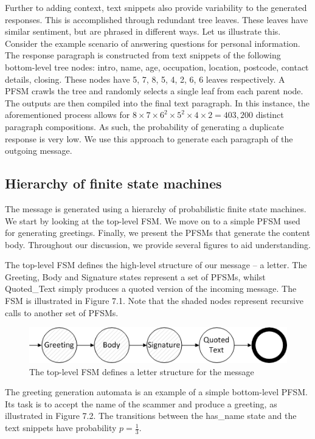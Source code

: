 Further to adding context, text snippets also provide variability to the generated responses. This is accomplished through redundant tree leaves. These leaves have similar sentiment, but are phrased in different ways. Let us illustrate this. Consider the example scenario of answering questions for personal information. The response paragraph is constructed from text snippets of the following bottom-level tree nodes: intro, name, age, occupation, location, postcode, contact details, closing. These nodes have 5, 7, 8, 5, 4, 2, 6, 6 leaves respectively. A PFSM crawls the tree and randomly selects a single leaf from each parent node. The outputs are then compiled into the final text paragraph. In this instance, the aforementioned process allows for $8 \times 7 \times 6^2 \times 5 ^ 2 \times 4 \times 2 = 403,200$ distinct paragraph compositions. As such, the probability of generating a duplicate response is very low. We use this approach to generate each paragraph of the outgoing message.

\subsection{Hierarchy of finite state machines}

The message is generated using a hierarchy of probabilistic finite state machines. We start by looking at the top-level FSM. We move on to a simple PFSM used for generating greetings. Finally, we present the PFSMs that generate the content body. Throughout our discussion, we provide several figures to aid understanding. 

The top-level FSM defines the high-level structure of our message -- a letter. The Greeting, Body and Signature states represent a set of PFSMs, whilst Quoted\_Text simply produces a quoted version of the incoming message. The FSM is illustrated in Figure 7.1. Note that the shaded nodes represent recursive calls to another set of PFSMs.

\begin{figure}[h]
\centering
\includegraphics{pics/top-level-fsm.png}
\caption{The top-level FSM defines a letter structure for the message}
\end{figure}

The greeting generation automata is an example of a simple bottom-level PFSM. Its task is to accept the name of the scammer and produce a greeting, as illustrated in Figure 7.2. The transitions between the has\_name state and the text snippets have probability $p = \frac{1}{3}$.


